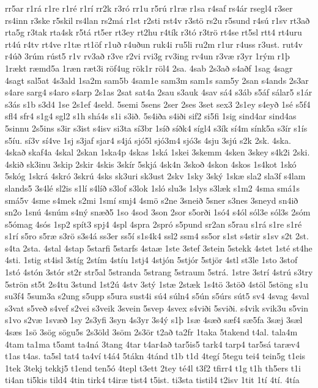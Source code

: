 {rr5ar
r1rá
r1re
r1ré
r1rí
rr2k
r3ró
rr1u
r5rú
r1ræ
r1sa
r4saf
rs4ár
rsegl4
r3ser
rs4inn
r3ske
r5skil
rs4lan
rs2má
r1st
r2sti
rst4v
r3stö
rs2u
r5sund
r4sú
r1sv
rt3að
rta5g
r3tak
rta4sk
r5tá
rt5er
rt3ey
rt2hu
r4tík
r3tó
r3trö
rt4se
rt5sl
rtt4
rt4uru
rt4ú
r4tv
rt4ve
r1tæ
rt1öf
r1uð
r4uðun
ruk4i
ru5li
ru2m
r1ur
r4uss
r3ust.
rut4v
r4úð
3rúm
rúst5
r1v
rv3að
r3ve
r2vi
rvi3g
rv3ing
rv4un
r3væ
r3yr
1rým
r1þ
1rækt
ræmd5a
1ræn
ræt3i
röf4ug
rök1r
röl4
2sa.
4sab
2s3að
s4aðf
1sag
4sagr
4sagt
sal5at
4s3ald
1sa2m
sam5b
4sam1e
sam3m
sam1s
sam5y
2san
s4ands
2s3ar
s4are
sarg4
s4aro
s4arp
2s1as
2sat
sat4a
2sau
s3auk
4sav
sá4
s3áb
s5áf
sálar5
s1ár
s3ás
s1b
s3d4
1se
2s1ef
4seld.
5semi
5sens
2ser
2ses
3set
sex3
2s1ey
s4eyð
1sé
s5f4
sfl4
sfr4
s1g4
sgl2
s1h
shá4s
s1i
s3ið.
5s4iða
s4iði
sif2
si5fi
1sig
sind4ar
sind4as
5sinnu
2s5ins
s3ir
s3ist
s4isv
si3ta
sí3br
1síð
síðk4
sígl4
s3ík
sí4m
sínk5a
s3ír
s1ís
s5íu.
sí3v
sí4ve
1sj
s3jaf
sjar4
s4já
sjó5l
sjó3m4
sjó3s
4sju
3sjú
s2k
2sk.
4ska.
4skað
skaf4a
4skal
2skan
1ska4p
4skas
1ská
1skei
3skemm
4sken
3skey
s4k2i
2ski.
4skið
sk3inu
3skip
2skir
4skis
3skír
5skjá
4sk4n
3skoð
4skon
4skos
1s4kot
1skó
5skóg
1skrá
4skró
3skrú
4sks
sk3uri
sk3ust
2skv
1sky
3ský
1skæ
sla2
sla3f
s4lam
slands5
3s4lé
sl2is
s1lí
s4líð
s3lof
s3lok
1sló
slu3s
1slys
s3læk
s1m2
4sma
smá1s
smá5v
4sme
s4mek
s2mi
1smí
smj4
4smö
s2ne
3sneið
5sner
s3nes
3sneyd
sn4ið
sn2o
1snú
4snúm
s4ný
snæð5
1so
4sod
3son
2sor
s5orði
1só4
s4ól
sól3e
sól3s
2sóm
s5ómag
4sós
1sp2
spít3
spj4
4spl
4spra
2spró
s5pund
sr2an
s5rau
s1rá
s1re
s1ré
s1rí
s5ro
s5ræ
s3rö
s3s4á
ss3er
ss5í
s1s4k4
ssl2
ssm4
ss5or
s1st
s4stir
s1sv
s2t
2st.
s4ta
2sta.
4stal
4stap
5starfi
5starfs
4staæ
1ste
3stef
3stein
5stekk
4stet
1sté
st4he
4sti.
1stig
st4isl
3stíg
2stím
4stíu
1stj4
4stjón
5stjór
5stjör
4stl
st3le
1sto
3stof
1stó
4stón
3stór
st2r
str5al
5stranda
5strang
5straum
5strá.
1stre
3strí
4strú
s3try
5strön
st5t
2s4tu
3stund
1st2ú
4stv
3stý
1stæ
2stæk
1s4tö
3stöð
4stöl
5stöng
s1u
su3f4
5sum3a
s2ung
s5upp
s5ura
sust4i
sú4
súln4
s5ún
s5úrs
sút5
sv4
4svag
4sval
s3vat
s5veð
s4vef
s2vei
s3veik
3svein
5svep
4svex
s4viði
5sviði.
s4vik
svik3u
s5vin
s1vo
s2væ
1svæð
1sy
2s3yfi
3syn
4s3yr
3s4ý
s1þ
1sæ
4sæð
sæf4
sæ5fa
3sæj
3sæl
4sæs
1sö
3sög
sögu5s
2s3öld
3söm
2s3ör
t2að
ta2fr
1taka
5takend
t4al.
tala4m
4tam
ta1ma
t5amt
ta4ná
3tang
4tar
t4ar4að
tar5is5
tark4
tarp4
tar5sá
taræv4
t1as
t4as.
ta5sl
tat4
ta4ví
t4á4
5tákn
4tánd
t1b
t1d
4tegí
5tegu
tei4
tein5g
t1eis
1tek
3tekj
tekkj5
t1end
ten5ó
4tepl
t3ett
2tey
té4l
t3f2
tfirr4
t1g
t1h
th5ers
t1i
ti4an
ti5kis
tild4
4tin
tirk4
t4iræ
tist4
t5ist.
ti3sta
tistil4
t2isv
1tit
1tí
4tí.
4tía
}
